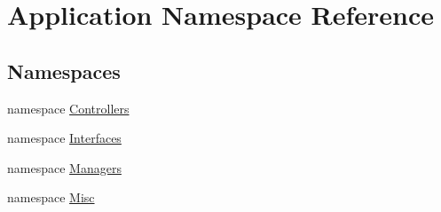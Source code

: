 \hypertarget{namespace_application}{}\section{Application Namespace Reference}
\label{namespace_application}
\subsection*{Namespaces}
\begin{DoxyCompactItemize}
\item 
namespace \mbox{\hyperlink{namespace_application_1_1_controllers}{Controllers}}
\item 
namespace \mbox{\hyperlink{namespace_application_1_1_interfaces}{Interfaces}}
\item 
namespace \mbox{\hyperlink{namespace_application_1_1_managers}{Managers}}
\item 
namespace \mbox{\hyperlink{namespace_application_1_1_misc}{Misc}}
\end{DoxyCompactItemize}
